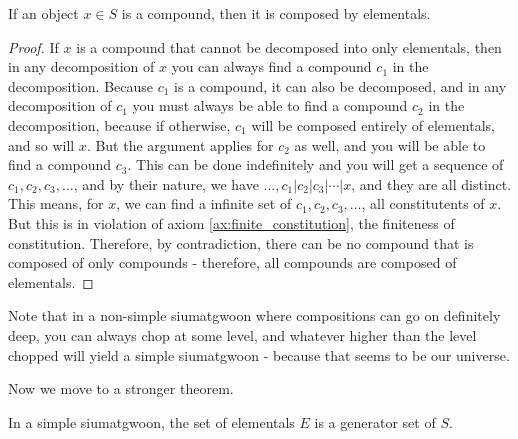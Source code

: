 \begin{lemma}\label{lem:compounds-are-composed-by-elementals}
    If an object $x\in S$ is a compound, then it is composed by elementals.
\end{lemma}
\begin{proof}

    If $x$ is a compound that cannot be decomposed into only elementals, then in any decomposition of $x$ you can always find a compound $c_1$ in the decomposition. Because $c_1$ is a compound, it can also be decomposed, and in any decomposition of $c_1$ you must always be able to find a compound $c_2$ in the decomposition, because if otherwise, $c_1$ will be composed entirely of elementals, and so will $x$. But the argument applies for $c_2$ as well, and you will be able to find a compound $c_3$. This can be done indefinitely and you will get a sequence of $c_1, c_2, c_3, \ldots$, and by their nature, we have  $\ldots, c_1|c_2|c_3|\cdots|x$, and they are all distinct. This means, for $x$, we can find a infinite set of $c_1, c_2, c_3, \ldots$, all constitutents of $x$. But this is in violation of axiom \ref{ax:finite_constitution}, the finiteness of constitution. Therefore, by contradiction, there can be no compound that is composed of only compounds - therefore, all compounds are composed of elementals.
\end{proof}


Note that in a non-simple siumatgwoon where compositions can go on definitely deep, you can always chop at some level, and whatever higher than the level chopped will yield a simple siumatgwoon - because that seems to be our universe. 


   



Now we move to a stronger theorem.

\begin{theorem}\label{thm:elementals-are-a-generator-set-in-simple-siumatgwoons} 
    In a simple siumatgwoon, the set of elementals $E$ is a generator set of $S$.
\end{theorem}

